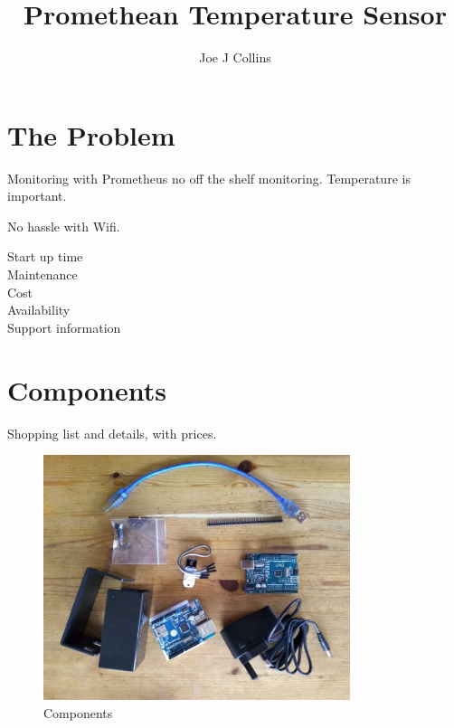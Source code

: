 \documentclass[a4paper, 12pt]{article}
\title{Promethean Temperature Sensor}
\author{Joe J Collins}
\begin{document}
\maketitle
\tableofcontents


\section{The Problem}

Monitoring with Prometheus
no off the shelf monitoring.
Temperature is important.

No hassle with Wifi.

\begin{description}
  \item[Start up time]
  \item[Maintenance]
  \item[Cost]
  \item[Availability]
  \item[Support information] 
\end{description}

\section{Components}

Shopping list and details, with prices.

\begin{figure}[H]
  \centering
  \includegraphics[width=0.8\textwidth]{components.jpg}
  \caption{Components}
\end{figure}
\end{document}
